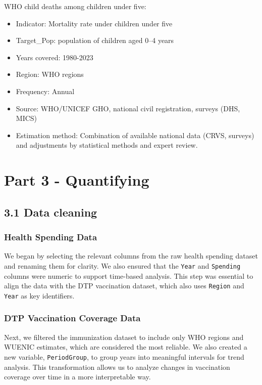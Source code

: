 \documentclass[
]{article}
\begin{document}
WHO child deaths among children under five:

\begin{itemize}
\item
  Indicator: Mortality rate under children under five
\item
  Target\_Pop: population of children aged 0--4 years
\item
  Years covered: 1980-2023
\item
  Region: WHO regions
\item
  Frequency: Annual
\item
  Source: WHO/UNICEF GHO, national civil registration, surveys (DHS,
  MICS)
\item
  Estimation method: Combination of available national data (CRVS,
  surveys) and adjustments by statistical methods and expert review.
\end{itemize}

\section{Part 3 - Quantifying}\label{part-3---quantifying}

\subsection{3.1 Data cleaning}\label{data-cleaning}

\subsubsection{Health Spending Data}\label{health-spending-data}

We began by selecting the relevant columns from the raw health spending
dataset and renaming them for clarity. We also ensured that the
\texttt{Year} and \texttt{Spending} columns were numeric to support
time-based analysis. This step was essential to align the data with the
DTP vaccination dataset, which also uses \texttt{Region} and
\texttt{Year} as key identifiers.

\subsubsection{DTP Vaccination Coverage
Data}\label{dtp-vaccination-coverage-data}

Next, we filtered the immunization dataset to include only WHO regions
and WUENIC estimates, which are considered the most reliable. We also
created a new variable, \texttt{PeriodGroup}, to group years into
meaningful intervals for trend analysis. This transformation allows us
to analyze changes in vaccination coverage over time in a more
interpretable way.
\end{document}
